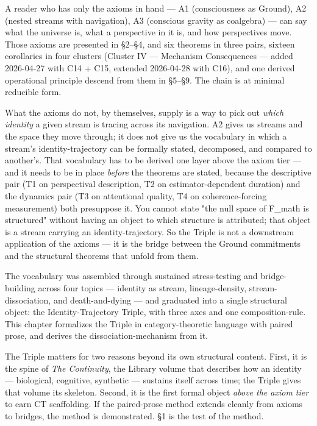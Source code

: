 \documentclass[11pt, openany]{book}
\begin{document}
A reader who has only the axioms in hand --- A1 (consciousness as Ground), A2 (nested streams with navigation), A3 (conscious gravity as coalgebra) --- can say what the universe is, what a perspective in it is, and how perspectives move. Those axioms are presented in §2–§4, and six theorems in three pairs, sixteen corollaries in four clusters (Cluster IV --- Mechanism Consequences --- added 2026-04-27 with C14 + C15, extended 2026-04-28 with C16), and one derived operational principle descend from them in §5–§9. The chain is at minimal reducible form.

What the axioms do not, by themselves, supply is a way to pick out \textit{which identity} a given stream is tracing across its navigation. A2 gives us streams and the space they move through; it does not give us the vocabulary in which a stream's identity-trajectory can be formally stated, decomposed, and compared to another's. That vocabulary has to be derived one layer above the axiom tier --- and it needs to be in place \textit{before} the theorems are stated, because the descriptive pair (T1 on perspectival description, T2 on estimator-dependent duration) and the dynamics pair (T3 on attentional quality, T4 on coherence-forcing measurement) both presuppose it. You cannot state "the null space of F\_\allowbreak{}math is structured" without having an object to which structure is attributed; that object is a stream carrying an identity-trajectory. So the Triple is not a downstream application of the axioms --- it is the bridge between the Ground commitments and the structural theorems that unfold from them.

The vocabulary was assembled through sustained stress-testing and bridge-building across four topics --- identity as stream, lineage-density, stream-dissociation, and death-and-dying --- and graduated into a single structural object: the Identity-Trajectory Triple, with three axes and one composition-rule. This chapter formalizes the Triple in category-theoretic language with paired prose, and derives the dissociation-mechanism from it.

The Triple matters for two reasons beyond its own structural content. First, it is the spine of \textit{The Continuity}, the Library volume that describes how an identity --- biological, cognitive, synthetic --- sustains itself across time; the Triple gives that volume its skeleton. Second, it is the first formal object \textit{above the axiom tier} to earn CT scaffolding. If the paired-prose method extends cleanly from axioms to bridges, the method is demonstrated. §1 is the test of the method.
\end{document}
